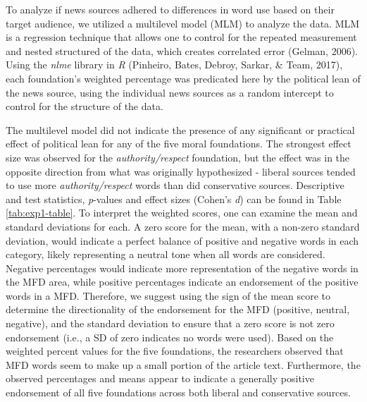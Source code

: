 \documentclass[english,,man]{apa6}
\begin{document}
To analyze if news sources adhered to differences in word use based on their target audience, we utilized a multilevel model (MLM) to analyze the data. MLM is a regression technique that allows one to control for the repeated measurement and nested structured of the data, which creates correlated error (Gelman, 2006). Using the \emph{nlme} library in \emph{R} (Pinheiro, Bates, Debroy, Sarkar, \& Team, 2017), each foundation's weighted percentage was predicated here by the political lean of the news source, using the individual news sources as a random intercept to control for the structure of the data.

The multilevel model did not indicate the presence of any significant or practical effect of political lean for any of the five moral foundations. The strongest effect size was observed for the \emph{authority/respect} foundation, but the effect was in the opposite direction from what was originally hypothesized - liberal sources tended to use more \emph{authority/respect} words than did conservative sources. Descriptive and test statistics, \emph{p}-values and effect sizes (Cohen's \emph{d}) can be found in Table \ref{tab:exp1-table}. To interpret the weighted scores, one can examine the mean and standard deviations for each. A zero score for the mean, with a non-zero standard deviation, would indicate a perfect balance of positive and negative words in each category, likely representing a neutral tone when all words are considered. Negative percentages would indicate more representation of the negative words in the MFD area, while positive percentages indicate an endorsement of the positive words in a MFD. Therefore, we suggest using the sign of the mean score to determine the directionality of the endorsement for the MFD (positive, neutral, negative), and the standard deviation to ensure that a zero score is not zero endorsement (i.e., a SD of zero indicates no words were used). Based on the weighted percent values for the five foundations, the researchers observed that MFD words seem to make up a small portion of the article text. Furthermore, the observed percentages and means appear to indicate a generally positive endorsement of all five foundations across both liberal and conservative sources.
\end{document}
